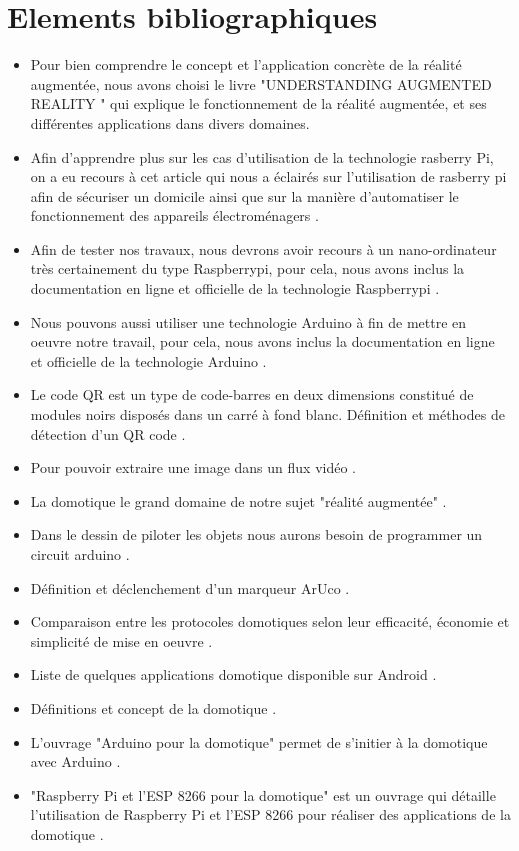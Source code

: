\documentclass[12pt,a4paper]{article}
\begin{document}
\newpage
\section{Elements bibliographiques}

\begin{itemize}
  \item Pour bien comprendre le concept et l'application concrète de la réalité augmentée, nous avons choisi le livre "UNDERSTANDING AUGMENTED REALITY "\cite{Ref1} qui explique le fonctionnement de la réalité augmentée, et ses différentes applications dans divers domaines.
  \item Afin d'apprendre plus sur les cas d'utilisation de la technologie rasberry Pi, on a eu recours à cet article qui nous a éclairés sur l'utilisation de rasberry pi afin de sécuriser un domicile ainsi que sur la manière d'automatiser le fonctionnement des appareils \'electrom\'enagers \cite{Ref2}.
  \item Afin de tester nos travaux, nous devrons avoir recours à un nano-ordinateur très certainement du type Raspberrypi, pour cela, nous avons inclus la documentation en ligne et officielle de la technologie Raspberrypi \cite{Ref3}.
  \item Nous pouvons aussi utiliser une technologie Arduino à fin de mettre en oeuvre notre travail, pour cela, nous avons inclus la documentation en ligne et officielle de la technologie Arduino \cite{Ref4}.
  \item Le code QR est un type de code-barres en deux dimensions constitué de modules noirs disposés dans un carré à fond blanc. Définition et méthodes de détection d'un QR code \cite{Ref5}.
  \item Pour pouvoir extraire une image dans un flux vidéo \cite{Ref6}.
  \item La domotique le grand domaine de notre sujet "réalité augmentée" \cite{Ref7}.
  \item Dans le dessin de piloter les objets nous aurons besoin de programmer un circuit arduino \cite{Ref8}.
  \item Définition et déclenchement d'un marqueur ArUco \cite{Ref9}.
    \item Comparaison entre les protocoles domotiques selon leur efficacité, économie et  simplicité de mise en oeuvre
      \cite{Ref10}.
      \item Liste de quelques applications domotique disponible sur Android
        \cite{Ref11}.
        \item Définitions et concept de la domotique 
          \cite{Ref12}.
           \item L'ouvrage "Arduino pour la domotique" permet de s'initier à la domotique avec Arduino
             \cite{Ref13}.
              \item "Raspberry Pi et l'ESP 8266 pour la domotique" est un ouvrage qui détaille l'utilisation de Raspberry Pi et l'ESP 8266 pour réaliser des applications de la domotique
  \cite{Ref14}.
\end{itemize}
\end{document}
